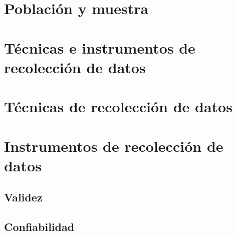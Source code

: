 \ifconhipotesis
\section{Población y muestra}

\ifmodoplan
\section{Técnicas e instrumentos de recolección de datos}
\else
\section{Técnicas de recolección de datos}

\section{Instrumentos de recolección de datos}
\subsection{Validez}
\subsection{Confiabilidad}
\fi
\fi
